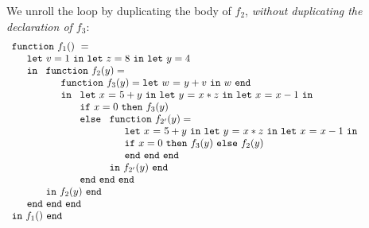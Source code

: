 We unroll the loop by duplicating the body of $f_2$, \emph{without
duplicating the declaration of $f_3$}:
\begin{equation}
\label{FunctionalConstructionProgramLCUnrolled}
\begin{array}{l}
\mathtt{function}\ f_1()\ = \\
  \quad
  \begin{array}{l}
     \mathtt{let}\ v = 1 \ 
     \mathtt{in\ let}\ z = 8 \ 
     \mathtt{in\ let}\ y = 4\\
     \mathtt{in}\ 
     \begin{array}[t]{l}
       \mathtt{function}\ f_2(y) = \\
       \quad \begin{array}{l}  
               \mathtt{function}\ f_3(y) = \letin w {y+v} w\\
               \mathtt{in}\
               \begin{array}[t]{l}
                  \letinD x {5+y} {
                  \letinD y {x*z} {
                   \letinD x {x-1} {}}}\\ 
                  \mathtt{if}\ {x=0}\
                  \mathtt{then}\ {\call {f_3} {y}}\\
                  \mathtt{else}\
                   \begin{array}[t]{l}
                      \mathtt{function}\ f_{2'}(y) = \\
                      \quad \begin{array}[t]{l}
                              \letinD x {5+y} {
                                \letinD y {x*z} {
                                  \letinD x {x-1} {}}}\\ 
                                    \ite {x=0} {\call {f_3} {y}}
                                               {\call {f_2} {y}}\\
                              \mathtt{end}\ \mathtt{end}\ \mathtt{end}
                            \end{array}\\
                      \mathtt{in}\ \call{f_{2'}} {y}\ \mathtt{end}
                  \end{array}\\
                  \mathtt{end}\ \mathtt{end}\ \mathtt{end}
               \end{array}
            \end{array}\\
       \mathtt{in}\ \call{f_2} {y}\ \mathtt{end}
     \end{array}\\
     \mathtt{end}\ \mathtt{end}\ \mathtt{end}
  \end{array}\\
  \mathtt{in}\ \call{f_1} {}\ \mathtt{end}
\end{array}
\end{equation}
